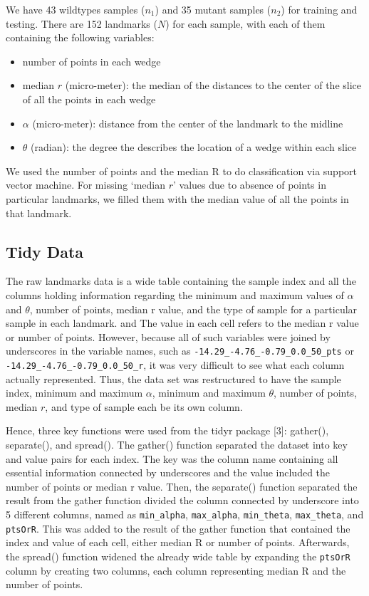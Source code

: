 \documentclass[10pt,letterpaper]{article}
\providecommand{\tightlist}{%
  \setlength{\itemsep}{0pt}\setlength{\parskip}{0pt}}
\begin{document}
We have 43 wildtypes samples (\(n_1\)) and 35 mutant samples (\(n_2\))
for training and testing. There are 152 landmarks (\(N\)) for each
sample, with each of them containing the following variables:

\begin{itemize}
\tightlist
\item
  number of points in each wedge
\item
  median \(r\) (micro-meter): the median of the distances to the center
  of the slice of all the points in each wedge
\item
  \(\alpha\) (micro-meter): distance from the center of the landmark to
  the midline
\item
  \(\theta\) (radian): the degree the describes the location of a wedge
  within each slice
\end{itemize}

We used the number of points and the median R to do classification via
support vector machine. For missing `median \(r\)' values due to absence
of points in particular landmarks, we filled them with the median value
of all the points in that landmark.

\subsection{Tidy Data}\label{tidy-data}

The raw landmarks data is a wide table containing the sample index and
all the columns holding information regarding the minimum and maximum
values of \(\alpha\) and \(\theta\), number of points, median r value,
and the type of sample for a particular sample in each landmark. and The
value in each cell refers to the median r value or number of points.
However, because all of such variables were joined by underscores in the
variable names, such as \texttt{-14.29\_-4.76\_-0.79\_0.0\_50\_pts} or
\texttt{-14.29\_-4.76\_-0.79\_0.0\_50\_r}, it was very difficult to see
what each column actually represented. Thus, the data set was
restructured to have the sample index, minimum and maximum \(\alpha\),
minimum and maximum \(\theta\), number of points, median \(r\), and type
of sample each be its own column.

Hence, three key functions were used from the tidyr package {[}3{]}:
gather(), separate(), and spread(). The gather() function separated the
dataset into key and value pairs for each index. The key was the column
name containing all essential information connected by underscores and
the value included the number of points or median r value. Then, the
separate() function separated the result from the gather function
divided the column connected by underscore into 5 different columns,
named as \texttt{min\_alpha}, \texttt{max\_alpha}, \texttt{min\_theta},
\texttt{max\_theta}, and \texttt{ptsOrR}. This was added to the result
of the gather function that contained the index and value of each cell,
either median R or number of points. Afterwards, the spread() function
widened the already wide table by expanding the \texttt{ptsOrR} column
by creating two columns, each column representing median R and the
number of points.
\end{document}
